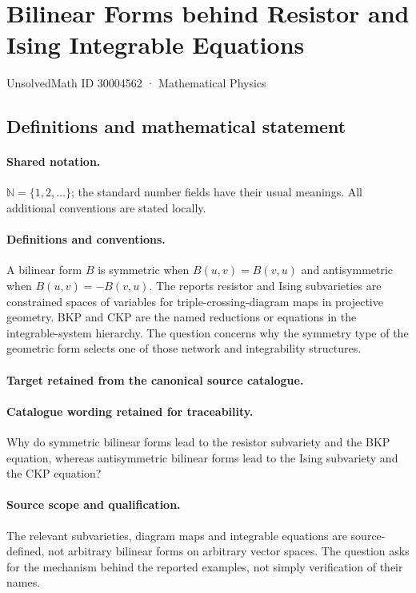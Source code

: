 \documentclass[11pt]{article}
\begin{document}
\setcounter{section}{30004561}
\section{Bilinear Forms behind Resistor and Ising Integrable Equations}\label{30004562}
{\small UnsolvedMath ID 30004562 · Mathematical Physics}
\subsection{Definitions and mathematical statement}

\paragraph{Shared notation.}$\mathbb N=\{1,2,\ldots\}$; the standard number fields have their usual meanings. All additional conventions are stated locally.


\paragraph{Definitions and conventions.}
A bilinear form $B$ is symmetric when $B(u,v)=B(v,u)$ and antisymmetric when $B(u,v)=-B(v,u)$. The report\textquotesingle s resistor and Ising subvarieties are constrained spaces of variables for triple-crossing-diagram maps in projective geometry. BKP and CKP are the named reductions or equations in the integrable-system hierarchy. The question concerns why the symmetry type of the geometric form selects one of those network and integrability structures.

\paragraph{Target retained from the canonical source catalogue.}
\paragraph{Catalogue wording retained for traceability.}
Why do symmetric bilinear forms lead to the resistor subvariety and the BKP equation, whereas antisymmetric bilinear forms lead to the Ising subvariety and the CKP equation?

\paragraph{Source scope and qualification.}
The relevant subvarieties, diagram maps and integrable equations are source-defined, not arbitrary bilinear forms on arbitrary vector spaces. The question asks for the mechanism behind the reported examples, not simply verification of their names.
\end{document}
